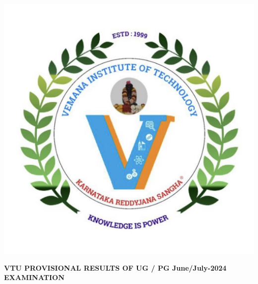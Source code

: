 \documentclass[a4paper,12pt]{article}
\begin{document}
\begin{minipage}{0.2\textwidth}
    \includegraphics[width=\textwidth]{vitlogo.jpg} %
\end{minipage}

\begin{center}
    \textbf{VTU PROVISIONAL RESULTS OF UG / PG June/July-2024 EXAMINATION}
\end{center}

\vspace{0.5cm}
\end{document}
